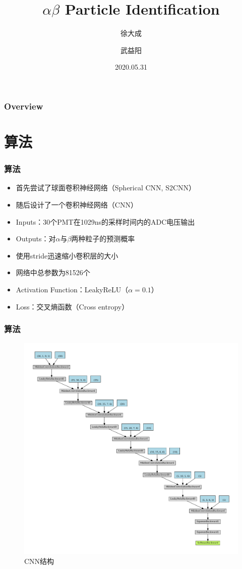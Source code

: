 \documentclass{beamer}
\title[Identify]{$\alpha \beta$ Particle Identification}
\author[xOasis]{徐大成 \and 武益阳}
\institute[THU]{清华大学}
\date{2020.05.31}
\begin{document}
\frame{\titlepage}

\begin{frame}
\frametitle{Overview}
\tableofcontents
\end{frame}

\section{算法}

\begin{frame}
\frametitle{算法}
\begin{itemize}
    \item <1-> 首先尝试了球面卷积神经网络（Spherical CNN, S2CNN）
    \item <2-> 随后设计了一个卷积神经网络（CNN）
    \item <3-> Inputs：30个PMT在1029ns的采样时间内的ADC电压输出
    \item <3-> Outputs：对$\alpha$与$\beta$两种粒子的预测概率
    \item <4-> 使用stride迅速缩小卷积层的大小
    \item <5-> 网络中总参数为81526个
    \item <6-> Activation Function：LeakyReLU（$\alpha=0.1$）
    \item <7-> Loss：交叉熵函数（Cross entropy）
\end{itemize}
\end{frame}

\begin{frame}
\frametitle{算法}
\begin{figure}[H]
    \centering
    \includegraphics[width=0.6\linewidth]{net.pdf}
    \caption{CNN结构}
\end{figure}
\end{frame}
\end{document}
